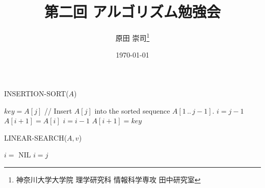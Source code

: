\documentclass[10pt]{jarticle}
\title{第二回 アルゴリズム勉強会}
\author{原田 崇司\thanks{神奈川大学大学院 理学研究科 情報科学専攻 田中研究室}}
\date{\today}
\newcommand\NoDo{\renewcommand\algorithmicdo{}}
\newcommand\NoThen{\renewcommand\algorithmicthen{}}
\begin{document}
\maketitle
\thispagestyle{empty}

%
%
%
%
%
%


\begin{algorithm}
 INSERTION-SORT($A$)
 \begin{algorithmic}[1]
  \NoDo
   \State $key = A[j]$
   \State // Insert $A[j]$ into the sorted sequence $A[1 \, .. \, j-1]$.
   \State $i = j - 1$
    \State $A[i+1] = A[i]$
    \State $i = i - 1$
   \EndWhile
   \State $A[i+1] = key$
  \EndFor
 \end{algorithmic}
\end{algorithm}

\begin{algorithm}
 LINEAR-SEARCH($A, v$)
 \begin{algorithmic}[1]
  \State $i =$ NIL
  \NoDo
   \NoThen
    \State $i = j$
    \State {}
   \EndIf
  \EndFor
  \State {}
 \end{algorithmic}
\end{algorithm}

\end{document}
